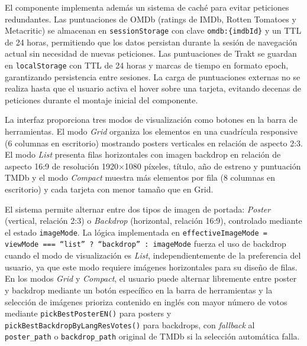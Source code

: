 El componente implementa además un sistema de caché para evitar peticiones redundantes. Las puntuaciones de OMDb (ratings de IMDb, Rotten Tomatoes y Metacritic) se almacenan en \texttt{sessionStorage} con clave \texttt{omdb:\{imdbId\}} y un TTL de 24 horas, permitiendo que los datos persistan durante la sesión de navegación actual sin necesidad de nuevas peticiones. Las puntuaciones de Trakt se guardan en \texttt{localStorage} con TTL de 24 horas y marcas de tiempo en formato epoch, garantizando persistencia entre sesiones. La carga de puntuaciones externas no se realiza hasta que el usuario activa el hover sobre una tarjeta, evitando decenas de peticiones durante el montaje inicial del componente.

La interfaz proporciona tres modos de visualización como botones en la barra de herramientas. El modo \textit{Grid} organiza los elementos en una cuadrícula responsive (6 columnas en escritorio) mostrando posters verticales en relación de aspecto 2:3. El modo \textit{List} presenta filas horizontales con imagen backdrop en relación de aspecto 16:9 de resolución 1920$\times$1080 píxeles, título, año de estreno y puntuación TMDb y el modo \textit{Compact} muestra más elementos por fila (8 columnas en escritorio) y cada tarjeta con menor tamaño que en Grid.

El sistema permite alternar entre dos tipos de imagen de portada: \textit{Poster} (vertical, relación 2:3) o \textit{Backdrop} (horizontal, relación 16:9), controlado mediante el estado \texttt{imageMode}. La lógica implementada en \texttt{effectiveImageMode = viewMode === ``list'' ? ``backdrop'' : imageMode} fuerza el uso de backdrop cuando el modo de visualización es \textit{List}, independientemente de la preferencia del usuario, ya que este modo requiere imágenes horizontales para su diseño de filas. En los modos \textit{Grid} y \textit{Compact}, el usuario puede alternar libremente entre poster y backdrop mediante un botón específico en la barra de herramientas y la selección de imágenes prioriza contenido en inglés con mayor número de votos mediante \texttt{pickBestPosterEN()} para posters y \texttt{pickBestBackdropByLangResVotes()} para backdrops, con \textit{fallback} al \texttt{poster\_path} o \texttt{backdrop\_path} original de TMDb si la selección automática falla.

